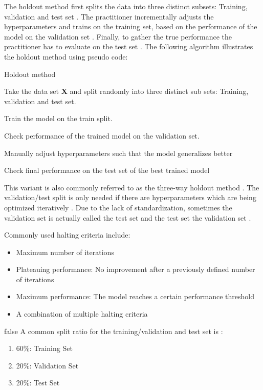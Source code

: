 \documentclass[draft,final,oneside]{vutinfth} %
\begin{document}
The holdout method first splits the data into three distinct subsets: Training, validation and test set \cite{holdoutcrossvalidation}. The practitioner incrementally adjusts the hyperparameters and trains on the training set, based on the performance of the model on the validation set \cite{holdoutcrossvalidation}. Finally, to gather the true performance the practitioner has to evaluate on the test set \cite{holdoutcrossvalidation}. The following algorithm illustrates the holdout method using pseudo code:

\begin{algorithm}
\caption{Holdout method \cite{holdoutcrossvalidation}}\label{holdoutalgo}
Take the data set $\boldsymbol{X}$ and split randomly into three distinct sub sets: Training, validation and test set.

 {
Train the model on the train split.

Check performance of the trained model on the validation set.

Manually adjust hyperparameters such that the model generalizes better
}

Check final performance on the test set of the best trained model

\end{algorithm}

This variant is also commonly referred to as the three-way holdout method \cite{holdoutcrossvalidation}. The validation/test split is only needed if there are hyperparameters which are being optimized iteratively \cite{holdoutcrossvalidation}.
Due to the lack of standardization, sometimes the validation set is actually called the test set and the test set the validation set \cite{patternrecognitionandnn} \cite{anintroductiontoneuralnetworks}.

Commonly used halting criteria include:
\begin{itemize}
\item Maximum number of iterations \cite{kerashalting}
\item Plateauing performance: No improvement after a previously defined number of iterations \cite{haltingcriteria}
\item Maximum performance: The model reaches a certain performance threshold \cite{kerashalting}
\item A combination of multiple halting criteria \cite{kerashalting}
\end{itemize}

\if false
A common split ratio for the training/validation and test set is \cite{holdoutcrossvalidation}:
\begin{enumerate}
\item 60\%: Training Set
\item 20\%: Validation Set
\item 20\%: Test Set
\end{enumerate}
\fi
\end{document}
